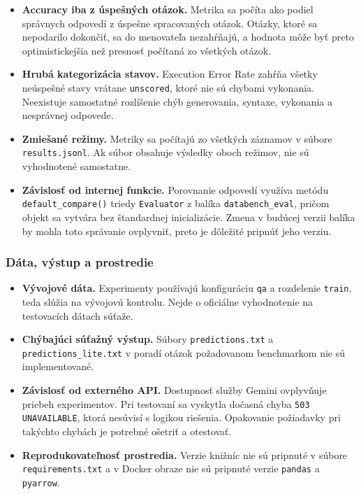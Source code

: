 \begin{itemize}
    \item \textbf{Accuracy iba z úspešných otázok.} Metrika sa počíta ako podiel správnych odpovedí z úspešne spracovaných otázok. Otázky, ktoré sa nepodarilo dokončiť, sa do menovateľa nezahŕňajú, a hodnota môže byť preto optimistickejšia než presnosť počítaná zo všetkých otázok.
    \item \textbf{Hrubá kategorizácia stavov.} Execution Error Rate zahŕňa všetky neúspešné stavy vrátane \texttt{unscored}, ktoré nie sú chybami vykonania. Neexistuje samostatné rozlíšenie chýb generovania, syntaxe, vykonania a nesprávnej odpovede.
    \item \textbf{Zmiešané režimy.} Metriky sa počítajú zo všetkých záznamov v súbore \texttt{results.jsonl}. Ak súbor obsahuje výsledky oboch režimov, nie sú vyhodnotené samostatne.
    \item \textbf{Závislosť od internej funkcie.} Porovnanie odpovedí využíva metódu \texttt{default\_compare()} triedy \texttt{Evaluator} z balíka \texttt{databench\_eval}, pričom objekt sa vytvára bez štandardnej inicializácie. Zmena v budúcej verzii balíka by mohla toto správanie ovplyvniť, preto je dôležité pripnúť jeho verziu.
\end{itemize}

\subsubsection*{Dáta, výstup a prostredie}

\begin{itemize}
    \item \textbf{Vývojové dáta.} Experimenty používajú konfiguráciu \texttt{qa} a rozdelenie \texttt{train}, teda slúžia na vývojovú kontrolu. Nejde o oficiálne vyhodnotenie na testovacích dátach súťaže.
    \item \textbf{Chýbajúci súťažný výstup.} Súbory \texttt{predictions.txt} a \texttt{predictions\_lite.txt} v poradí otázok požadovanom benchmarkom nie sú implementované.
    \item \textbf{Závislosť od externého API.} Dostupnosť služby Gemini ovplyvňuje priebeh experimentov. Pri testovaní sa vyskytla dočasná chyba \texttt{503 UNAVAILABLE}, ktorá nesúvisí s logikou riešenia. Opakovanie požiadavky pri takýchto chybách je potrebné ošetriť a otestovať.
    \item \textbf{Reprodukovateľnosť prostredia.} Verzie knižníc nie sú pripnuté v súbore \texttt{requirements.txt} a v Docker obraze nie sú pripnuté verzie \texttt{pandas} a \texttt{pyarrow}.
\end{itemize}

